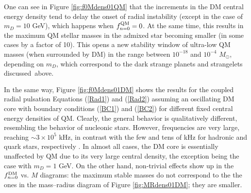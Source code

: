 \documentclass[universe,article,accept,moreauthors,pdftex]{Definitions/mdpi}
\begin{document}

One can see in Figure \ref{fig:f0Mdens01QM} that the increments in the DM central energy density tend to delay the onset  of radial instability (except in the case of $m_{D}=10$ GeV), which happens when $f^{\rm QM}_{n=0}=0$. At the same time, this results in the maximum QM stellar masses in the admixed star becoming smaller (in some cases by a factor of 10). This opens a new stability window of ultra-low QM masses (when surrounded by DM) in the range between $10^{-18}$ and $10^{-4}$ $M_{\odot}$, depending on $m_{D}$, which correspond to the dark strange planets and strangelets discussed~above.


In the same way, Figure \ref{fig:f0Mdens01DM} shows the results for the coupled radial pulsation Equations (\ref{Rad1}) and (\ref{Rad2}) assuming an oscillating DM core with boundary conditions (\ref{BC1}) and (\ref{BC2}) for different fixed central energy densities of QM. Clearly, the general behavior is qualitatively different, resembling the behavior of nucleonic stars. However, frequencies are very large, reaching $\sim$$3\times{10^{5}}$ kHz, in contrast with the few and tens of kHz for hadronic and quark stars, respectively \cite{Jimenez:2019iuc}. In almost all cases, the DM core is essentially unaffected by QM due to its very large central density, the exception being the case with $m_{D}=1$ GeV. On the other hand, non-trivial effects show up in the $f^{\rm DM}_{n=0}$ vs. $M$ diagrams: the maximum stable masses do not correspond to the the ones in the mass--radius diagram of Figure \ref{fig:MRdens01DM}; they are smaller.
\end{document}
